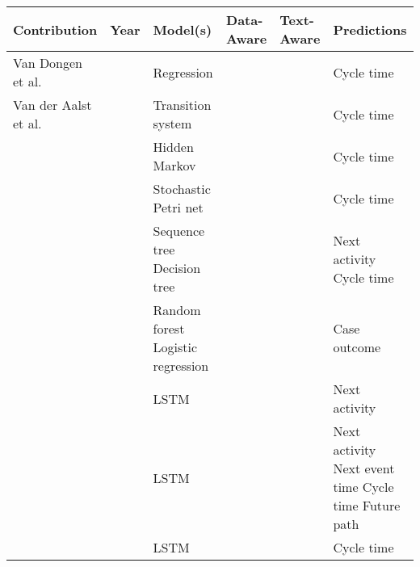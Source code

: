 \begin{table}[]
	\renewcommand{\arraystretch}{1.5}
	\begin{tabularx}{\textwidth}{
			>{\hsize=2.0\hsize}X
			>{\hsize=0.4\hsize}X
			>{\hsize=1.3\hsize}X
			>{\hsize=0.5\hsize}X
			>{\hsize=0.5\hsize}X
			>{\hsize=1.3\hsize}X
		}
		\toprule
		\textbf{Contribution} & \textbf{Year} & \textbf{Model(s)}  & \textbf{Data-Aware} &  \textbf{Text-Aware} & \textbf{Predictions} \\ \midrule
		 Van Dongen et al. \cite{DBLP:conf/otm/DongenCA08}& \citeyear{DBLP:conf/otm/DongenCA08} & Regression  & \checkmark & \xmark& Cycle time\\
		 
		 Van der Aalst et al. \cite{DBLP:journals/is/AalstSS11}&  \citeyear{DBLP:journals/is/AalstSS11}& Transition system  
		   & \xmark & \xmark & Cycle time \\   
		   
		 \citeauthor{DBLP:conf/colcom/PandeyNC11} \cite{DBLP:conf/colcom/PandeyNC11} & \citeyear{DBLP:conf/colcom/PandeyNC11} & Hidden Markov & \xmark & \xmark & Cycle time \\
		 
		 \citeauthor{DBLP:conf/icsoc/Rogge-SoltiW13} \cite{DBLP:conf/icsoc/Rogge-SoltiW13} & \citeyear{DBLP:conf/icsoc/Rogge-SoltiW13} &Stochastic Petri net & \xmark & \xmark & Cycle time\\
		 
		 \citeauthor{DBLP:conf/dis/CeciLFCM14} \cite{DBLP:conf/dis/CeciLFCM14} & \citeyear{DBLP:conf/dis/CeciLFCM14} & Sequence tree \newline Decision tree& \checkmark & \xmark & Next activity \newline Cycle time \\
		 
		 \citeauthor{DBLP:conf/bpm/TeinemaaDMF16}  \cite{DBLP:conf/bpm/TeinemaaDMF16} &  \citeyear{DBLP:conf/bpm/TeinemaaDMF16} & Random forest \newline Logistic regression & \checkmark & \checkmark & Case outcome \\
		 
		 \citeauthor{ DBLP:conf/bpm/EvermannRF16} \cite{ DBLP:conf/bpm/EvermannRF16} &  \citeyear{ DBLP:conf/bpm/EvermannRF16}& LSTM & \xmark & \xmark & Next activity \\
		 
		 \citeauthor{DBLP:conf/caise/TaxVRD17} \cite{DBLP:conf/caise/TaxVRD17} & \citeyear{DBLP:conf/caise/TaxVRD17} & LSTM & \xmark & \xmark & Next activity \newline Next event time \newline Cycle time \newline Future path \\
		 \citeauthor{DBLP:conf/ssci/NavarinVPS17} \cite{DBLP:conf/ssci/NavarinVPS17} &  \citeyear{DBLP:conf/ssci/NavarinVPS17}&  LSTM & \checkmark  & \xmark & Cycle time\\
		 

\end{tabularx}
\end{table}
